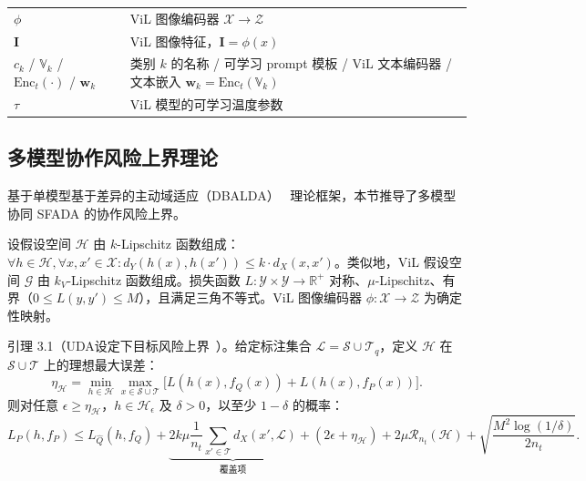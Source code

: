 \begin{table}[!htbp]
{\begin{tabular}{ll}
        $\phi$ & ViL 图像编码器 $\mathcal{X}\to\mathcal{Z}$ \\
        $\mathbf{I}$ & ViL 图像特征，$\mathbf{I}=\phi(x)$ \\
        $c_k$ / $\mathbb{V}_k$ / $\mathrm{Enc}_t(\cdot)$ / $\mathbf{w}_k$ & 类别 $k$ 的名称 / 可学习 prompt 模板 / ViL 文本编码器 / 文本嵌入 $\mathbf{w}_k=\mathrm{Enc}_t(\mathbb{V}_k)$ \\
        $\tau$ & ViL 模型的可学习温度参数 \\
        \bottomrule
    \end{tabular}}
\end{table}

\subsection{多模型协作风险上界理论}

基于单模型基于差异的主动域适应（DBALDA）~\cite{mathelin2022discrepancy} 理论框架，本节推导了多模型协同 SFADA 的协作风险上界。

设假设空间 $\mathcal{H}$ 由 $k$-Lipschitz 函数组成：$\forall h\in\mathcal{H},\forall x,x'\in\mathcal{X}: d_Y(h(x),h(x'))\leq k\cdot d_X(x,x')$。类似地，ViL 假设空间 $\mathcal{G}$ 由 $k_V$-Lipschitz 函数组成。损失函数 $L:\mathcal{Y}\times\mathcal{Y}\to\mathbb{R}^+$ 对称、$\mu$-Lipschitz、有界（$0\leq L(y,y')\leq M$），且满足三角不等式。ViL 图像编码器 $\phi:\mathcal{X}\to\mathcal{Z}$ 为确定性映射。

引理 3.1（UDA设定下目标风险上界~\cite{mathelin2022discrepancy}）。给定标注集合 $\mathcal{L}=\mathcal{S}\cup\mathcal{T}_q$，定义 $\mathcal{H}$ 在 $\mathcal{S}\cup\mathcal{T}$ 上的理想最大误差：
\begin{equation}
\eta_{\mathcal{H}} = \min_{h\in\mathcal{H}}\max_{x\in\mathcal{S}\cup\mathcal{T}}\big[L(h(x), f_Q(x)) + L(h(x), f_P(x))\big].
\label{eq:eta_H}
\end{equation}
则对任意 $\epsilon\geq\eta_{\mathcal{H}}$，$h\in\mathcal{H}_\epsilon$ 及 $\delta>0$，以至少 $1-\delta$ 的概率：
\begin{equation}
L_P(h,f_P) \leq L_{\hat{Q}}(h,f_Q) + \underbrace{2k\mu\frac{1}{n_t}\sum_{x'\in\mathcal{T}}d_X(x',\mathcal{L})}_{\text{覆盖项}} + (2\epsilon+\eta_{\mathcal{H}}) + 2\mu\mathcal{R}_{n_t}(\mathcal{H}) + \sqrt{\frac{M^2\log(1/\delta)}{2n_t}}.
\label{eq:uda_bound}
\end{equation}

